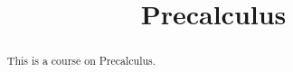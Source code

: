 \documentclass[12pt]{xourse}
\title{Precalculus}
\begin{document}
\begin{abstract}
This is a course on Precalculus. 
\end{abstract} 

\maketitle
\end{document}
